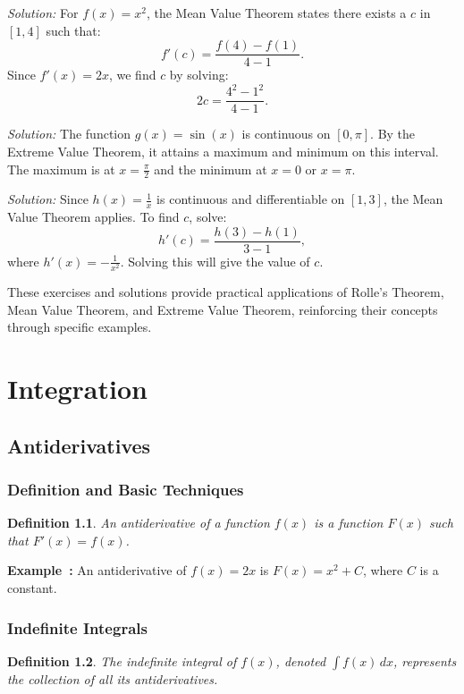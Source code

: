 \documentclass[a4paper,12pt]{book}
\newenvironment{solution}[1][]
{\par\noindent\textit{Solution:} \rmfamily}{\medskip}
\newcounter{example}
\newenvironment{example}[1][\theexample]
  {\refstepcounter{example}\par\medskip\noindent\textbf{Example~#1:} \rmfamily}
  {\medskip}
\newtheorem{definition}{Definition}
\begin{document}
\begin{solution}[to Exercise 2]
For \( f(x) = x^2 \), the Mean Value Theorem states there exists a \( c \) in \([1, 4]\) such that:
\[ f'(c) = \frac{f(4) - f(1)}{4 - 1}. \]
Since \( f'(x) = 2x \), we find \( c \) by solving:
\[ 2c = \frac{4^2 - 1^2}{4 - 1}. \]
\end{solution}

\begin{solution}[to Exercise 3]
The function \( g(x) = \sin(x) \) is continuous on \([0, \pi]\). By the Extreme Value Theorem, it attains a maximum and minimum on this interval. The maximum is at \( x = \frac{\pi}{2} \) and the minimum at \( x = 0 \) or \( x = \pi \).
\end{solution}

\begin{solution}[to Exercise 4]
Since \( h(x) = \frac{1}{x} \) is continuous and differentiable on \([1, 3]\), the Mean Value Theorem applies. To find \( c \), solve:
\[ h'(c) = \frac{h(3) - h(1)}{3 - 1}, \]
where \( h'(x) = -\frac{1}{x^2} \). Solving this will give the value of \( c \).
\end{solution}

These exercises and solutions provide practical applications of Rolle's Theorem, Mean Value Theorem, and Extreme Value Theorem, reinforcing their concepts through specific examples.




\chapter{Integration}
\section{Antiderivatives}
\subsection{Definition and Basic Techniques}
\begin{definition}
An antiderivative of a function \( f(x) \) is a function \( F(x) \) such that \( F'(x) = f(x) \).
\end{definition}
\begin{example}
An antiderivative of \( f(x) = 2x \) is \( F(x) = x^2 + C \), where \( C \) is a constant.
\end{example}

\subsection{Indefinite Integrals}
\begin{definition}
The indefinite integral of \( f(x) \), denoted \( \int f(x) \, dx \), represents the collection of all its antiderivatives.
\end{definition}
\end{document}
